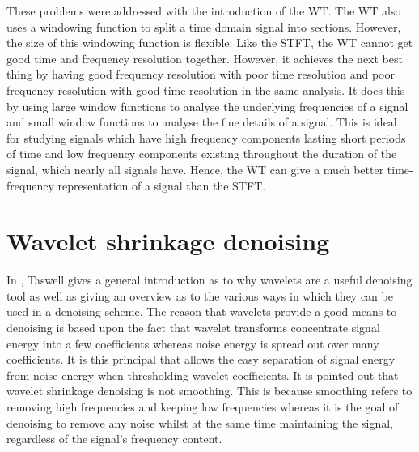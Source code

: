 \documentclass[12pt]{report}
\begin{document}
These problems were addressed with the introduction of the WT. The WT also
uses a windowing function to split a time domain signal into sections. However, the size
of this windowing function is flexible. Like the STFT, the WT cannot get good time and 
frequency resolution together. However, it achieves the next best thing by having good
frequency resolution with poor time resolution and poor frequency resolution with good time resolution
in the same analysis.
It does this by using large window functions to analyse the underlying frequencies of a signal
and small window functions to analyse the fine details of a signal.
This is ideal for studying signals which have high frequency components lasting short periods of
time and low frequency components existing throughout the duration of the signal, which nearly all signals have.
Hence, the WT can give a much better time-frequency representation of a signal than the STFT.


\section{Wavelet shrinkage denoising}
\label{sec:wsd}
In \cite{taswellHWW}, Taswell gives a general introduction as to why wavelets are a
useful denoising tool as well as giving an overview as to the various ways in which they
can be used in a denoising scheme. 
The reason that wavelets provide a good means to denoising is based upon the
fact that wavelet transforms concentrate signal energy into a few coefficients
whereas noise energy is spread out over many coefficients. It is this principal that 
allows the easy separation of signal energy from noise energy when thresholding
wavelet coefficients.
It is pointed out that wavelet shrinkage denoising
is not smoothing. This is because smoothing refers to removing high frequencies 
and keeping low frequencies whereas it is the goal of denoising to remove any noise 
whilst at the same time maintaining the signal, regardless of the signal's frequency content.
\end{document}
